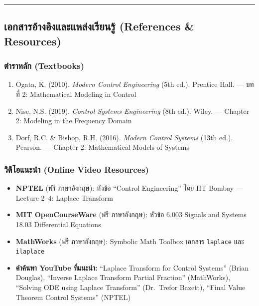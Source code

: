 \begin{center}\rule{0.5\linewidth}{0.5pt}\end{center}

\subsection{เอกสารอ้างอิงและแหล่งเรียนรู้ (References \&
Resources)}\label{uxe40uxe2duxe01uxe2auxe32uxe23uxe2duxe32uxe07uxe2duxe07uxe41uxe25uxe30uxe41uxe2buxe25uxe07uxe40uxe23uxe22uxe19uxe23-references-resources}

\subsubsection{ตำราหลัก
(Textbooks)}\label{uxe15uxe33uxe23uxe32uxe2buxe25uxe01-textbooks}

\begin{enumerate}
\def\labelenumi{\arabic{enumi}.}
\tightlist
\item
  Ogata, K. (2010). \emph{Modern Control Engineering} (5th ed.).
  Prentice Hall. --- บทที่ 2: Mathematical Modeling in Control
\item
  Nise, N.S. (2019). \emph{Control Systems Engineering} (8th ed.).
  Wiley. --- Chapter 2: Modeling in the Frequency Domain
\item
  Dorf, R.C. \& Bishop, R.H. (2016). \emph{Modern Control Systems} (13th
  ed.). Pearson. --- Chapter 2: Mathematical Models of Systems
\end{enumerate}

\subsubsection{วิดีโอแนะนำ (Online Video
Resources)}\label{uxe27uxe14uxe42uxe2duxe41uxe19uxe30uxe19uxe33-online-video-resources}

\begin{itemize}
\tightlist
\item
  \textbf{NPTEL} (ฟรี \textbar{} ภาษาอังกฤษ): หัวข้อ ``Control Engineering''
  โดย IIT Bombay --- Lecture 2--4: Laplace Transform
\item
  \textbf{MIT OpenCourseWare} (ฟรี \textbar{} ภาษาอังกฤษ): หัวข้อ 6.003
  Signals and Systems \textbar{} 18.03 Differential Equations
\item
  \textbf{MathWorks} (ฟรี \textbar{} ภาษาอังกฤษ): Symbolic Math Toolbox
  เอกสาร \texttt{laplace} และ \texttt{ilaplace}
\item
  \textbf{คำค้นหา YouTube ที่แนะนำ:} ``Laplace Transform for Control
  Systems'' (Brian Douglas), ``Inverse Laplace Transform Partial
  Fraction'' (MathWorks), ``Solving ODE using Laplace Transform''
  (Dr.~Trefor Bazett), ``Final Value Theorem Control Systems'' (NPTEL)
\end{itemize}

